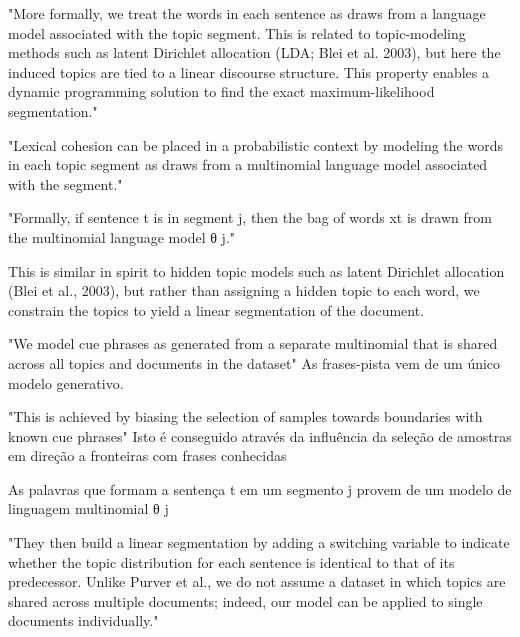 
"More formally, we treat the words in each sentence as draws from a language model associated with the topic segment. This is related to topic-modeling methods such as latent Dirichlet allocation (LDA; Blei et al. 2003), but here the induced topics are tied to a linear discourse structure. This property enables a dynamic programming solution to find the exact maximum-likelihood segmentation." 



"Lexical cohesion can be placed in a probabilistic context by modeling the words in each topic segment as draws from a multinomial language model associated with the segment."

"Formally, if sentence t is in segment j, then the bag of words xt is drawn from the multinomial language model θ j."


This is similar in spirit to hidden topic models such as latent Dirichlet allocation (Blei et al., 2003), but rather than assigning a hidden topic to each word, we constrain the topics to yield a linear segmentation of the document.


"We model cue phrases as generated from a separate multinomial that is shared across all topics and documents in the dataset"
As frases-pista vem de um único modelo generativo.


"This is achieved by biasing the selection of samples towards boundaries with known cue phrases"
{Isto é conseguido através da influência da seleção de amostras em direção a fronteiras com frases conhecidas}


{As palavras que formam a sentença t em um segmento j provem de um modelo de linguagem multinomial θ j}



"They then build a linear segmentation by adding a switching variable to indicate whether the topic distribution for each sentence is identical to that of its predecessor. Unlike Purver et al., we do not assume a dataset in which topics are shared across multiple documents; indeed, our model can be applied to single documents individually."

